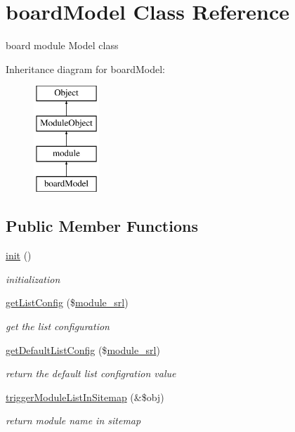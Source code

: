 \hypertarget{classboardModel}{}\section{board\+Model Class Reference}
\label{classboardModel}


board module Model class  


Inheritance diagram for board\+Model\+:\begin{figure}[H]
\begin{center}
\leavevmode
\includegraphics[height=4.000000cm]{classboardModel}
\end{center}
\end{figure}
\subsection*{Public Member Functions}
\begin{DoxyCompactItemize}
\item 
\hyperlink{classboardModel_a6195c2c2de16e5fee06e360aba66055a}{init} ()
\begin{DoxyCompactList}\small\item\em initialization \end{DoxyCompactList}\item 
\hyperlink{classboardModel_acbcd8af2157f310556985b8c720969ab}{get\+List\+Config} (\$\hyperlink{ko_8install_8php_a370bb6450fab1da3e0ed9f484a38b761}{module\+\_\+srl})
\begin{DoxyCompactList}\small\item\em get the list configuration \end{DoxyCompactList}\item 
\hyperlink{classboardModel_ac4e077b35257fffc1dc3af0a771f20fa}{get\+Default\+List\+Config} (\$\hyperlink{ko_8install_8php_a370bb6450fab1da3e0ed9f484a38b761}{module\+\_\+srl})
\begin{DoxyCompactList}\small\item\em return the default list configration value \end{DoxyCompactList}\item 
\hyperlink{classboardModel_a1960d5d832bbe3464065ec3c1ffce947}{trigger\+Module\+List\+In\+Sitemap} (\&\$obj)
\begin{DoxyCompactList}\small\item\em return module name in sitemap \end{DoxyCompactList}\end{DoxyCompactItemize}
